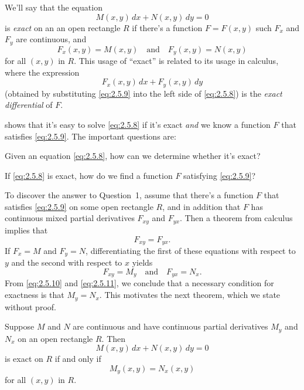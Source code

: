 We'll say that  the equation
\begin{equation} \label{eq:2.5.8}
M(x,y)\,dx+N(x,y)\,dy=0
\end{equation}
 is  \emph{\color{blue}exact} on an an open rectangle  $R$ if there's
a function $F=F(x,y)$ such  $F_x$
and $F_y$  are continuous, and
\begin{equation} \label{eq:2.5.9}
F_x(x,y)=M(x,y) \quad\text{and}\quad  F_y(x,y)=N(x,y)
\end{equation}
for  all  $(x,y)$ in $R$.
This usage of ``exact'' is related  to its usage in calculus,
where the expression
\[
F_x(x,y)\,dx+F_y(x,y)\,dy
\]
(obtained by substituting \eqref{eq:2.5.9} into the left side of
\eqref{eq:2.5.8}) is the  \emph{\color{blue}exact differential} of $F$.

 shows that it's easy to solve
\eqref{eq:2.5.8}
if it's exact \emph{\color{blue}and}  we know a function $F$ that satisfies
\eqref{eq:2.5.9}. The important questions are:
\begin{enumext}[
 label=\arabic*,
 font=\scshape,
 wrap-label={Question #1.},
 labelwidth=6em,
 ]
 \item Given an equation \eqref{eq:2.5.8}, how can we determine whether it's  exact?
\item If \eqref{eq:2.5.8} is exact, how do we find
a function $F$ satisfying \eqref{eq:2.5.9}?
\end{enumext}

To discover the answer to Question~1,
 assume that  there's a function $F$  that satisfies \eqref{eq:2.5.9} on
some open rectangle $R$, and in addition that $F$ has continuous mixed
partial derivatives $F_{xy}$ and $F_{yx}$.  Then a theorem from calculus
implies that
\begin{equation} \label{eq:2.5.10}
F_{xy}=F_{yx}.
\end{equation}
If $F_x=M$ and $F_y=N$,
differentiating the first of these equations with respect to
$y$ and the second with respect to $x$ yields
\begin{equation} \label{eq:2.5.11}
F_{xy}=M_y\quad\text{and}\quad   F_{yx}=N_x.
\end{equation}
From  \eqref{eq:2.5.10}  and \eqref{eq:2.5.11}, we conclude that
 a necessary condition for exactness is that $M_y=N_x$.
This motivates the next theorem, which we state without proof.

\begin{theorem}\label{thmtype:2.5.2}
Suppose  $M$ and
$N$ are continuous and have continuous partial derivatives
$M_y$ and $N_x$ on an open rectangle $R$. Then
\[
M(x,y)\,dx+N(x,y)\,dy=0
\]
is exact on $R$ if and only if
\begin{equation} \label{eq:2.5.12}
M_y(x,y)=N_x(x,y)
\end{equation}
for all $(x,y)$ in  $R$.
\end{theorem}

